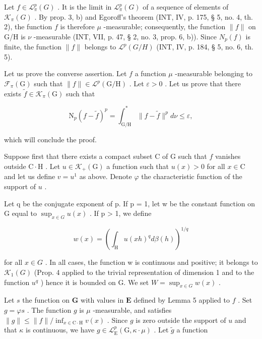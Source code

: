 Let \(f \in \mathcal{L}_{\pi}^{p}(G)\) . It is the limit in \(\mathcal{L}_{\pi}^{p}(G)\) of a sequence of elements of \(\mathcal{K}_{\pi}(G)\) . By prop. 3, b) and Egoroff's theorem (INT, IV, p. 175, § 5, no. 4, th. 2), the function \(f\) is therefore \(\mu\) -measurable; consequently, the function \(\|f\|\) on G/H is \(\nu\) -measurable (INT, VII, p. 47, § 2, no. 3, prop. 6, b)). Since \(N_{p}(f)\) is finite, the function \(\|f\|\) belongs to \(\mathcal{L}^{p}(G/H)\) (INT, IV, p. 184, § 5, no. 6, th. 5).

 Let us prove the converse assertion. Let \(f\) a function \(\mu\) -measurable belonging to \(\mathcal{F}_{\pi}(\mathrm{G})\) such that \(\|f\|\in\mathcal{L}^{p}(\mathrm{G}/\mathrm{H})\) . Let \(\varepsilon>0\) . Let us prove that there exists \(\widetilde{f}\in\mathcal{K}_{\pi}(\mathrm{G})\) such that

\[
\mathrm{N} _ {p} (f - \widetilde {f}) ^ {p} = \int_ {\mathrm{G/H}} ^ {*} \| f - \widetilde {f} \| ^ {p} d \nu \leqslant \varepsilon ,
\]

which will conclude the proof.

 Suppose first that there exists a compact subset C of G such that \(f\) vanishes outside \(\mathrm{C} \cdot \mathrm{H}\) . Let \(u \in \mathcal{K}_{+}(\mathrm{G})\) a function such that \(u(x) > 0\) for all \(x \in \mathrm{C}\) and let us define \(v = u^{1}\) as above. Denote \(\varphi\) the characteristic function of the support of \(u\) .

Let q be the conjugate exponent of p. If p = 1, let w be the constant function on G equal to \(\sup_{x \in G} u(x)\) . If p \textgreater{} 1, we define

\[
w (x) = \left(\int_ {\mathrm{H}} u (x h) ^ {q} d \beta (h)\right) ^ {1 / q}
\]

 for all \(x \in G\) . In all cases, the function w is continuous and positive; it belongs to \(\mathcal{K}_{1}(G)\) (Prop. 4 applied to the trivial representation of dimension 1 and to the function \(u^{q}\) ) hence it is bounded on G. We set \(W = \sup_{x \in G} w(x)\) .

 Let \(s\) the function on \(\mathbf{G}\) with values in \(\mathbf{E}\) defined by Lemma 5 applied to \(f\) . Set \(g = \varphi s\) . The function \(g\) is \(\mu\) -measurable, and satisfies \(\| g \| \leqslant \| f \| / \inf_{x \in \mathrm{C} \cdot \mathrm{H}} v(x)\) . Since \(g\) is zero outside the support of \(u\) and that \(\kappa\) is continuous, we have \(g \in \mathcal{L}_{\mathrm{E}}^{p}(\mathrm{G}, \kappa \cdot \mu)\) . Let \(\widetilde{g}\) a function

